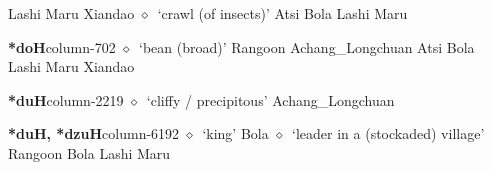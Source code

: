 \hspace{1ex}
         Lashi 
\hspace{1ex}
         Maru 
\hspace{1ex}
         Xiandao 
\hspace{1ex}
         $\diamond$~`crawl (of insects)'
         Atsi 
\hspace{1ex}
         Bola 
\hspace{1ex}
         Lashi 
\hspace{1ex}
         Maru 
  \item {\footnotesize \textbf{*doH}}{\tiny column-702}
         $\diamond$~`bean (broad)'
         Rangoon 
\hspace{1ex}
         Achang\_Longchuan 
\hspace{1ex}
         Atsi 
\hspace{1ex}
         Bola 
\hspace{1ex}
         Lashi 
\hspace{1ex}
         Maru 
\hspace{1ex}
         Xiandao 
  \item {\footnotesize \textbf{*duH}}{\tiny column-2219}
         $\diamond$~`cliffy / precipitous'
         Achang\_Longchuan 
  \item {\footnotesize \textbf{*duH, *dzuH}}{\tiny column-6192}
         $\diamond$~`king'
         Bola 
\hspace{1ex}
         $\diamond$~`leader in a (stockaded) village'
         Rangoon 
\hspace{1ex}
         Bola 
\hspace{1ex}
         Lashi 
\hspace{1ex}
         Maru 
\hspace{1ex}
